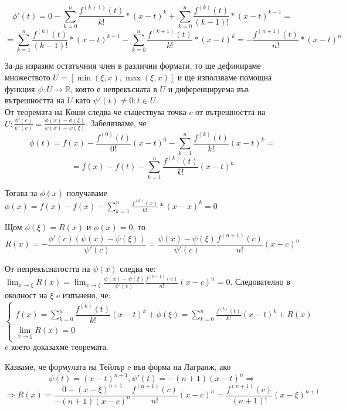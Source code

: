 \documentclass[fleqn,12pt]{article}
\begin{document}
\[\phi'(t)=0 - \sum_{k=0}^{n} \frac{f^{(k+1)}(t)}{k!}*(x-t)^{k} +  \sum_{k=0}^{n}\frac{f^{(k)}(t)}{(k-1)!}*(x-t)^{k-1} = \]
\[ =\sum_{k=1}^{n}\frac{f^{(k)}(t)}{(k-1)!}*(x-t)^{k-1} - \sum_{k=0}^{n} \frac{f^{(k+1)}(t)}{k!}*(x-t)^{k} = -\frac{f^{(n+1)}(t)}{n!}*(x-t)^n \]

За да изразим остатъчния член в различни формати, то ще дефинираме множеството $U=[\min(\xi,x),\max(\xi,x)]$ и ще използваме помощна функция $\psi:U\rightarrow\mathbb{R}$, която е непрекъсната в $U$
и диференцируема във вътрешността на $U$ като $\psi'(t) \neq 0 : t \in U$.\\
От теоремата на Коши следва че съществува точка $c$ от вътрешността на $U: \frac{\phi'(c)}{\psi'(c)}=\frac{\phi(x)-\phi(\xi)}{\psi(x)-\psi(\xi)}$.
Забелязваме, че
\[ \phi(t) = f(x) - \frac{f^{(0)}(t)}{0!}(x-t)^0 - \sum_{k=1}^{n}\frac{f^{(k)}(t)}{k!}(x-t)^k = \] 
\[ = f(x) - f(t) - \sum_{k=1}^{n}\frac{f^{(k)}(t)}{k!}(x-t)^k \]

Тогава за $\phi(x)$ получаваме $\phi(x) = f(x) - f(x) - \sum_{k=1}^{n}\frac{f^{(k)}(x)}{k!}*(x-x)^k = 0$

Щом $\phi(\xi) = R(x)$ и $\phi(x) = 0$, то 
\[R(x) = -\frac{\phi'(c)(\psi(x)-\psi(\xi))}{\psi'(c)} = \frac{\psi(x)-\psi(\xi)}{\psi'(c)}\frac{f^{(n+1)}(c)}{n!}(x-c)^n\]

От непрекъснатостта на $\psi(x)$ следва че: $\lim_{x\to\xi} R(x) = \lim_{x\to\xi} \frac{\psi(x)-\psi(\xi)}{\psi'(c)}\frac{f^{(n+1)}(c)}{n!}(x-c)^n = 0$.
Следователно в околност на $\xi$ e изпънено, че:
\[
\begin{cases}
    f(x) = \sum_{k = 0}^{n} \dfrac{f^{(k)}(t)}{k!}(x-t)^{k} + \phi(\xi) = \sum_{k = 0}^{n} \frac{f^{(k)}(t)}{k!}(x-t)^{k} + R(x)\\
    \lim_{x\to\xi} R(x) = 0
\end{cases}
\]
c което доказахме теоремата. 

Казваме, че формулата на Тейлър e във форма на Лагранж, ако 
\[ \psi(t)=(x-t)^{n+1}, \psi'(t)=-(n+1)(x-t)^n \Rightarrow \]
\[ \Rightarrow R(x)=\frac{0-(x-\xi)^{n+1}}{-(n+1)(x-c)^n}\frac{f^{(n+1)}(c)}{n!}(x-c)^n = \frac{f^{(n+1)}(c)}{(n+1)!}(x-\xi)^{n+1} \]
\end{document}
